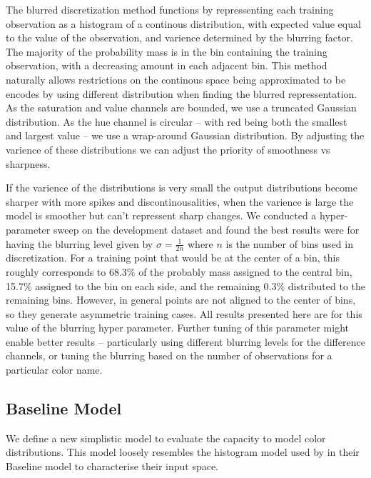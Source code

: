 \documentclass[11pt,letterpaper]{article}
\newcommand{\textcite}{\newcite}
\begin{document}
The blurred discretization method functions by repressenting each training observation as a histogram of a continous distribution, with expected value equal to the value of the observation, and varience determined by the blurring factor.
The majority of the probability mass is in the bin containing the training observation, with a decreasing amount in each adjacent bin.
This method naturally allows restrictions on the continous space being approximated to be encodes by using different distribution when finding the blurred repressentation.
As the saturation and value channels are bounded, we use a truncated Gaussian distribution.
As the hue channel is circular -- with red being both the smallest and largest value --  we use a wrap-around Gaussian distribution.
By adjusting the varience of these distributions we can adjust the priority of smoothness vs sharpness.

If the varience of the distributions is very small the output distributions become sharper with more spikes and discontinousalities,
when the varience is large the model is smoother but can't repressent sharp changes.
We conducted a hyper-parameter sweep on the development dataset and found the best results were for having the blurring level given by $\sigma = \frac{1}{2n}$ where $n$ is the number of bins used in discretization.
For a training point that would be at the center of a bin, this roughly corresponds to 68.3\% of the probably mass assigned to the central bin, 15.7\% assigned to the bin on each side, and the remaining 0.3\% distributed to the remaining bins.
However, in general points are not aligned to the center of bins, so they generate asymmetric training cases.
All results presented here are for this value of the blurring hyper parameter.
Further tuning of this parameter might enable better results -- particularly using different blurring levels for the difference channels, or tuning the blurring based on the number of observations for a particular color name.


\subsection{Baseline Model}\label{sec:baseline-model}
We define a new simplistic model to evaluate the capacity to model color distributions.
This model loosely resembles the histogram model used by \textcite{mcmahan2015bayesian} in their Baseline model to characterise their input space.
\end{document}
